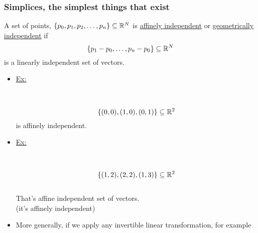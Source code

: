 \documentclass[../notes.tex]{subfiles}
\begin{document}
\subsubsection{Simplices, the simplest things that exist}
\begin{definition}
    A set of points, $\{p_0,p_1,p_2,\dots,p_n\}\subseteq \mathbb{R}^N$ is
    \underline{affinely independent} or \underline{geometrically independent}
    if 
    \[
        \{p_1-p_0,\dots,p_n-p_0\}\subseteq \mathbb{R}^N
    \]
    is a linearly independent set of vectors.
\end{definition}
\newpage
\begin{itemize}
    \item \underline{Ex:}\\
        \begin{center}
            \\
        \end{center}
        \[
            \{(0,0), (1,0), (0,1)\}\subseteq\mathbb{R}^2
        \]
        is affinely independent.\\
    \item \underline{Ex:}\\
        \begin{center}
            \\
        \end{center}
        \[
            \{(1,2), (2,2), (1,3)\}\subseteq\mathbb{R}^2
        \]\\
        That's affine independent set of vectors.\\
        (it's affinely independent)
    \item More generally, if we apply any invertible linear transformation, for example

\end{itemize}
\end{document}
